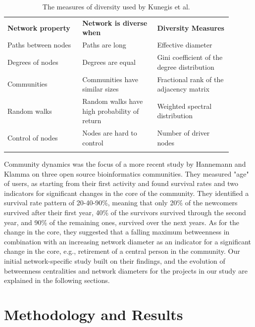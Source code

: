 \documentclass[12pt]{report}
\begin{document}
\begin{table}
\centering
\caption{The measures of diversity used by Kunegis et al. \cite{Kunegis}}
\label{TableDiversityMeasuresKunegisEtAl}
\begin{tabular}{p{0.3\linewidth} p{0.3\linewidth} p{0.3\linewidth}}
\hline\noalign{\smallskip}
\textbf{Network property} & \textbf{Network is diverse when} & \textbf{Diversity Measures} \\
\noalign{\smallskip}\hline\noalign{\smallskip}
Paths between nodes & Paths are long & Effective diameter \\ \hline
Degrees of nodes  & Degrees are equal & Gini coefficient of the degree distribution \\ \hline
Communities  & Communities have similar sizes & Fractional rank of the adjacency matrix \\ \hline
Random walks  & Random walks have high probability of return & Weighted spectral distribution \\ \hline
Control of nodes  & Nodes are hard to control & Number of driver nodes \\
\noalign{\smallskip}\hline
\end{tabular}
\end{table}

Community dynamics was the focus of a more recent study by Hannemann and Klamma \cite{Hannemann} on three open source bioinformatics communities. They measured "age" of users, as starting from their first activity and found survival rates and two indicators for significant changes in the core of the community. They identified a survival rate pattern of 20-40-90\%, meaning that only 20\% of the newcomers survived after their first year, 40\% of the survivors survived through the second year, and 90\% of the remaining ones, survived over the next years. As for the change in the core, they suggested that a falling maximum betweenness in combination with an increasing network diameter as an indicator for a significant change in the core, e.g., retirement of a central person in the community. Our initial network-specific study built on their findings, and the evolution of betweenness centralities and network diameters for the projects in our study are explained in the following sections. 

\section{Methodology and Results}
\label{methodology}
\end{document}
